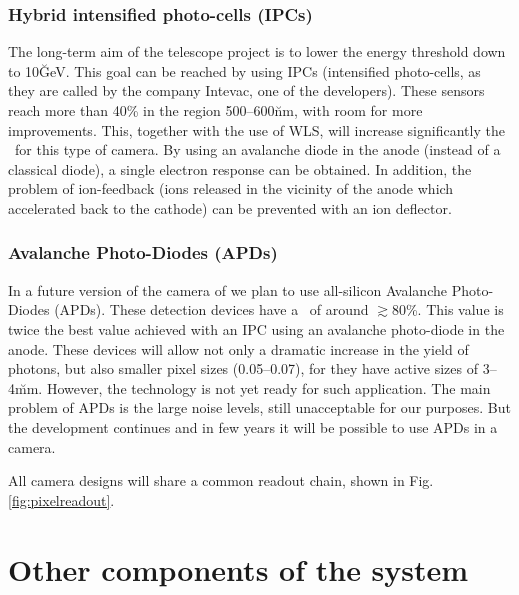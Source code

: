 \subsubsection{Hybrid intensified photo-cells (IPCs)}
%
The long-term aim of  the  telescope project  is  to lower the  energy
threshold down to 10\u{GeV}.  This goal can be  reached by using  IPCs
(intensified photo-cells, as they  are called by the company  Intevac,
one of the developers). These sensors reach more  than 40\% \QE in the
region 500--600\u{nm}, with room for more improvements. This, together
with the use of WLS, will increase  significantly the \QEeff\ for this
type of camera. By using an avalanche diode in the anode (instead of a
classical diode),  a   single electron  response  can  be obtained. In
addition,  the problem of ion-feedback  (ions released in the vicinity
of the anode  which accelerated back to the  cathode) can be prevented
with an ion deflector.

\subsubsection{Avalanche Photo-Diodes (APDs)}
%
In a future version of the camera of \MAGIC we plan to use all-silicon
Avalanche Photo-Diodes (APDs). These  detection devices have a \QEeff\ 
of around $\gtrsim$80\%.  This value is twice  the best value achieved
with an IPC using an avalanche photo-diode in the anode. These devices
will allow not  only a dramatic  increase  in the yield  of \Cherenkov
photons, but also smaller pixel  sizes (0.05\deg--0.07\deg), for  they
have active  sizes of 3--4\u{mm}. However,  the technology is  not yet
ready for such  application.  The main problem   of APDs is  the large
noise levels, still unacceptable for our purposes. But the development
continues and in few years it will be possible to use APDs in a \MAGIC
camera.

\bigskip

All camera designs will share a common readout chain, shown in
Fig.\ref{fig:pixelreadout}.


\section{Other components of the system}
\label{sec:othercomp}


